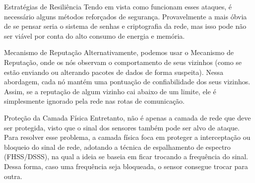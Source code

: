 \begin{frame}{Estratégias de Resiliência}
    Tendo em vista como funcionam esses ataques, é necessário alguns métodos reforçados de segurança. Provavelmente a mais óbvia de se pensar seria o sistema de senhas e criptografia da rede, mas isso pode não ser viável por conta do alto consumo de energia e memória.

\end{frame}

\begin{frame}{Mecanismo de Reputação}
    Alternativamente, podemos usar o Mecanismo de Reputação, onde os nós observam o comportamento de seus vizinhos (como se estão enviando ou alterando pacotes de dados de forma suspeita). Nessa abordagem, cada nó mantém uma pontuação de confiabilidade dos seus vizinhos. Assim, se a reputação de algum vizinho cai abaixo de um limite, ele é simplesmente ignorado pela rede nas rotas de comunicação.

\end{frame}

\begin{frame}{Proteção da Camada Física}
    Entretanto, não é apenas a camada de rede que deve ser protegida, visto que o sinal dos sensores também pode ser alvo de ataque. Para resolver esse problema, a camada física foca em proteger a interceptação ou bloqueio do sinal de rede, adotando a técnica de espalhamento de espectro (FHSS/DSSS), na qual a ideia se baseia em ficar trocando a frequência do sinal. Dessa forma, caso uma frequência seja bloqueada, o sensor consegue trocar para outra.

\end{frame}